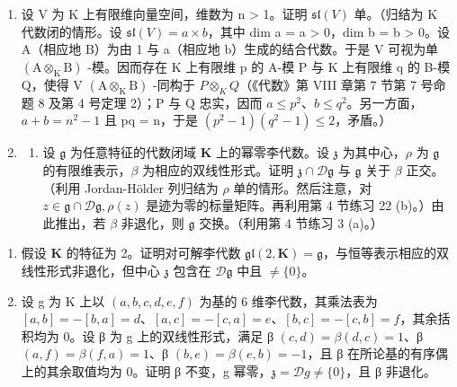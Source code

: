 \begin{enumerate}
\def\labelenumi{\arabic{enumi}.}
\setcounter{enumi}{20}
\item
  设 V 为 K 上有限维向量空间，维数为 n \textgreater{} 1。证明 \(\mathfrak{sl}(V)\) 单。（归结为 K 代数闭的情形。设 \(\mathfrak{sl}(V) = a \times b\)，其中 dim a = a \textgreater{} 0，dim b = b \textgreater{} 0。设 A（相应地 B）为由 1 与 a（相应地 b）生成的结合代数。于是 V 可视为单 \((\mathrm{A} \otimes_{\mathrm{K}} \mathrm{B})\) -模。因而存在 K 上有限维 p 的 A-模 P 与 K 上有限维 q 的 B-模 Q，使得 V \((\mathrm{A} \otimes_{\mathrm{K}} \mathrm{B})\) -同构于 \(P \otimes_{K} Q\)（《代数》第 VIII 章第 7 节第 7 号命题 8 及第 4 号定理 2）；P 与 Q 忠实，因而 \(a \leqslant p^{2}\)、\(b \leqslant q^{2}\)。另一方面，\(a + b = n^{2} - 1\) 且 pq = n，于是 \((p^{2} - 1)(q^{2} - 1) \leqslant 2\)，矛盾。）
\item
  \begin{enumerate}
  \def\labelenumii{(\alph{enumii})}
  \tightlist
  \item
    设 \(\mathfrak{g}\) 为任意特征的代数闭域 \(\mathbf{K}\) 上的幂零李代数。设 \(\mathfrak{z}\) 为其中心，\(\rho\) 为 \(\mathfrak{g}\) 的有限维表示，\(\beta\) 为相应的双线性形式。证明 \(\mathfrak{z}\cap \mathcal{D}\mathfrak{g}\) 与 \(\mathfrak{g}\) 关于 \(\beta\) 正交。（利用 Jordan-Hölder 列归结为 \(\rho\) 单的情形。然后注意，对 \(z\in \mathfrak{g}\cap \mathcal{D}\mathfrak{g},\rho (z)\) 是迹为零的标量矩阵。再利用第 4 节练习 22 (b)。）由此推出，若 \(\beta\) 非退化，则 \(\mathfrak{g}\) 交换。（利用第 4 节练习 3 (a)。）
  \end{enumerate}
\end{enumerate}

\begin{enumerate}
\def\labelenumi{(\alph{enumi})}
\setcounter{enumi}{1}
\item
  假设 \(\mathbf{K}\) 的特征为 2。证明对可解李代数 \(\mathfrak{gl}(2,\mathbf{K}) = \mathfrak{g}\)，与恒等表示相应的双线性形式非退化，但中心 \(\mathfrak{z}\) 包含在 \(\mathcal{D}\mathfrak{g}\) 中且 \(\neq \{0\}\)。
\item
  设 g 为 K 上以 \((a, b, c, d, e, f)\) 为基的 6 维李代数，其乘法表为 \([a, b] = -[b, a] = d\)、\([a, c] = -[c, a] = e\)、\([b, c] = -[c, b] = f\)，其余括积均为 0。设 β 为 g 上的双线性形式，满足 β \((c, d) = \beta(d, c) = 1\)、β \((a, f) = \beta(f, a) = 1\)、β \((b, e) = \beta(e, b) = -1\)，且 β 在所论基的有序偶上的其余取值均为 0。证明 β 不变，g 幂零，\(\mathfrak{z} = \mathcal{D}g \neq \{0\}\)，且 β 非退化。
\end{enumerate}

